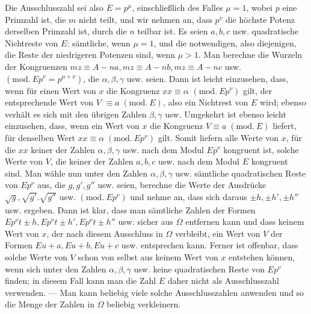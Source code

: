 Die Ausschlusszahl sei also \(E=p^\mu\), einschließlich des Falles \(\mu=1\), wobei \(p\) eine Primzahl ist, die \(m\) nicht teilt, und wir nehmen an, dass \(p^\nu\) die höchste Potenz
derselben Primzahl ist, durch die \(n\) teilbar ist. Es seien \(a,\allowbreak b,\allowbreak c\) usw. quadratische Nichtreste von \(E\): sämtliche, wenn \(\mu=1\), und die notwendigen, also diejenigen, die Reste der niedrigeren Potenzen sind, wenn \(\mu>1\). Man berechne die Wurzeln der Kongruenzen \(mz\equiv A-na,\allowbreak mz\equiv A-nb,\allowbreak mz\equiv A-nc\) usw. \((\mathrm{mod.}\ Ep^\nu=p^{\mu+\nu})\), die \(\alpha,\allowbreak \beta,\allowbreak \gamma\) usw. seien. Dann ist leicht einzusehen, dass, wenn für einen Wert von \(x\) die Kongruenz \(xx\equiv\alpha\) \((\mathrm{mod.}\ Ep^\nu)\) gilt, der entsprechende Wert von \(V\) \(\equiv a\; (\mathrm{mod}.\ E)\), also ein Nichtrest von \(E\) wird; ebenso verhält es sich mit den übrigen Zahlen \(\beta,\allowbreak \gamma\) usw. Umgekehrt ist ebenso leicht einzusehen, dass, wenn ein Wert von \(x\) die Kongruenz \(V\equiv a\; (\mathrm{mod}.\ E)\) liefert, für denselben Wert \(xx\equiv\alpha\; (\mathrm{mod}.\ Ep^\nu)\) gilt. Somit liefern alle Werte von \(x\), für die \(xx\) keiner der Zahlen \(\alpha,\allowbreak \beta,\allowbreak \gamma\) usw. nach dem Modul \(Ep^\nu\) kongruent ist, solche Werte von \(V\), die keiner der Zahlen \(a,\allowbreak b,\allowbreak c\) usw. nach dem Modul \(E\) kongruent sind. Man wähle nun unter den Zahlen \(\alpha,\allowbreak \beta,\allowbreak \gamma\) usw. sämtliche quadratischen Reste von \(Ep^\nu\) aus, die \(g,\allowbreak g',\allowbreak g''\) usw. seien, berechne die Werte der Ausdrücke \(\surd g,\allowbreak \surd{g'}.\surd{g''}\) usw. \((\mathrm{mod.}\ Ep^\nu)\) und nehme an, dass sich daraus \(\pm h,\allowbreak \pm h',\allowbreak \pm h''\) usw. ergeben. Dann ist klar, dass man sämtliche Zahlen der Formen \(Ep^\nu t\pm h,\allowbreak Ep^\nu t\pm h',\allowbreak Ep^\nu t\pm h''\) usw. sicher aus \(\Omega\) entfernen kann und dass keinem Wert von \(x\), der nach diesem Ausschluss in \(\Omega\) verbleibt, ein Wert von \(V\) der Formen \(Eu+a,\allowbreak Eu+b,\allowbreak Eu+c\) usw. entsprechen kann. Ferner ist offenbar, dass solche Werte von \(V\) schon von selbst aus keinem Wert von \(x\) entstehen können, wenn sich unter den Zahlen \(\alpha,\allowbreak \beta,\allowbreak \gamma\) usw. keine quadratischen Reste von \(Ep^\nu\) finden; in diesem Fall kann man die Zahl \(E\) daher nicht als Ausschlusszahl verwenden. — Man kann beliebig viele solche Ausschlusszahlen anwenden und so die Menge der Zahlen in \(\Omega\) beliebig verkleinern.

